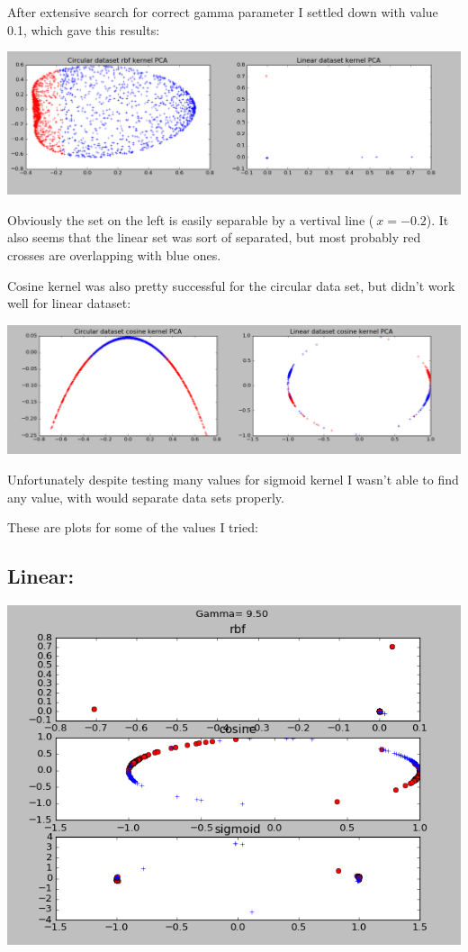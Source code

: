 \documentclass{article}
\begin{document}
After extensive search for correct gamma parameter I settled down with value 0.1, which gave this results:

\includegraphics[width=\textwidth]{rbf}

Obviously the set on the left is easily separable by a vertival line ($~x=-0.2$). It also seems that the
linear set was sort of separated, but most probably red crosses are overlapping with blue ones.

Cosine kernel was also pretty successful for the circular data set, but didn't work well for linear dataset:

\includegraphics[width=\textwidth]{cosine}

Unfortunately despite testing many values for sigmoid kernel I wasn't able to find any value, with would separate
data sets properly.

These are plots for some of the values I tried:

\subsection{Linear:}

\includegraphics[width=\textwidth]{lin}
\end{document}
